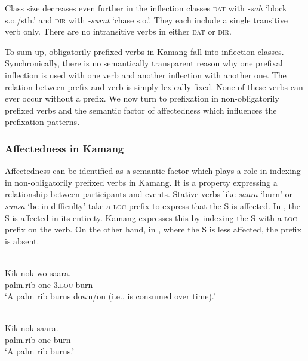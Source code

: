  

 



Class size decreases even further in the inflection classes \textsc{dat} with \textit{-sah} `block s.o./sth.' and \textsc{dir} with \textit{-surut} `chase s.o.'. They each include a single transitive verb only. There are no intransitive verbs in either \textsc{dat} or \textsc{dir}.

  To sum up, obligatorily prefixed verbs in Kamang fall into inflection classes. Synchronically, there is no semantically transparent reason why one prefixal inflection is used with one verb and another inflection with another one. The relation between prefix and verb is simply lexically fixed. None of these verbs can ever occur without a prefix. We now turn to prefixation in non-obligatorily prefixed verbs and the semantic factor of affectedness which influences the prefixation patterns. 

\subsubsection{Affectedness in Kamang}
Affectedness can be identified as a semantic factor which plays a role in indexing in non-obligatorily prefixed verbs in Kamang. It is a property expressing a relationship between participants and events. Stative verbs like \textit{saara} `burn' or \textit{suusa} `be in difficulty' take a \textsc{loc} prefix to express that the S is affected. In , the S is affected in its entirety. Kamang expresses this by indexing the S with a \textsc{loc} prefix on the verb. On the other hand, in , where the S is less affected, the prefix is absent.


\ea 
\label{ex:10:1239}
 \\ 
 \gll   Kik  nok  wo-saara.   \\
    palm.rib  one  3\textsc{.loc-}burn   \\
 \glt  `A palm rib burns down/on (i.e., is consumed over time).'
\z



\ea 
\label{ex:10:1240}
 \\ 
 \gll   Kik  nok  saara.   \\
  palm.rib  one  burn     \\
 \glt  `A palm rib burns.'
\z




